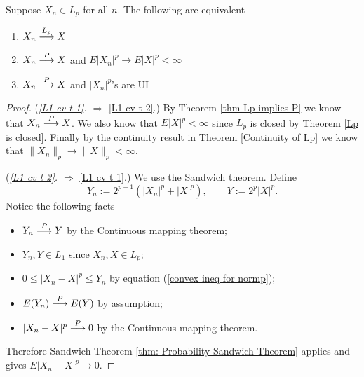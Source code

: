 \begin{theorem}
Suppose $X_n\in L_p $ for all $n$. The following are equivalent
\begin{enumerate}
\item\label{L1 cv t 1} $X_n\overset{\small L_p} \longrightarrow X$
\item\label{L1 cv t 2} $X_n\overset{\small P} \longrightarrow X$ and $E|X_n|^p \rightarrow E|X|^p<\infty$
\item\label{L1 cv t 3} $X_n\overset{\small P} \longrightarrow X$ and $|X_n|^p$'s are UI
\end{enumerate}
\end{theorem}
\begin{proof}

({\sl \ref{L1 cv t 1}. $\Longrightarrow$} \ref{L1 cv t 2}.)
By Theorem \ref{thm Lp implies P} we know that $X_n\overset{\small P} \longrightarrow X$.
We also know that $E|X|^p<\infty$ since $L_p$ is closed by Theorem \ref{Lp is closed}.
Finally  by the continuity result in  Theorem \ref{Continuity of Lp}  we know that $\|X_n \|_p\rightarrow \| X \|_p<\infty$.

({\sl \ref{L1 cv t 2}. $\Longrightarrow$} \ref{L1 cv t 1}.) We use the Sandwich theorem. Define
\[ Y_n:= 2^{p-1}(|X_n|^p + |X|^p),\qquad Y:= 2^p|X|^p.\]
Notice the following facts
\begin{itemize}
\item $Y_n\overset{\small P} \longrightarrow Y$ by the Continuous mapping theorem;
\item  $Y_n, Y\in L_1$  since $X_n, X\in L_p$;
\item $0\leq |X_n-X|^p\leq Y_n$ by equation (\ref{convex ineq for normp});
\item $E(Y_n)\overset{\small P} \longrightarrow E(Y)$ by assumption;
\item $|X_n - X|^p\overset{\small P} \longrightarrow 0$ by the Continuous mapping theorem.
\end{itemize}
Therefore  Sandwich Theorem \ref{thm: Probability Sandwich Theorem}  applies and gives $E|X_n - X|^p\rightarrow 0$.




\end{proof}
